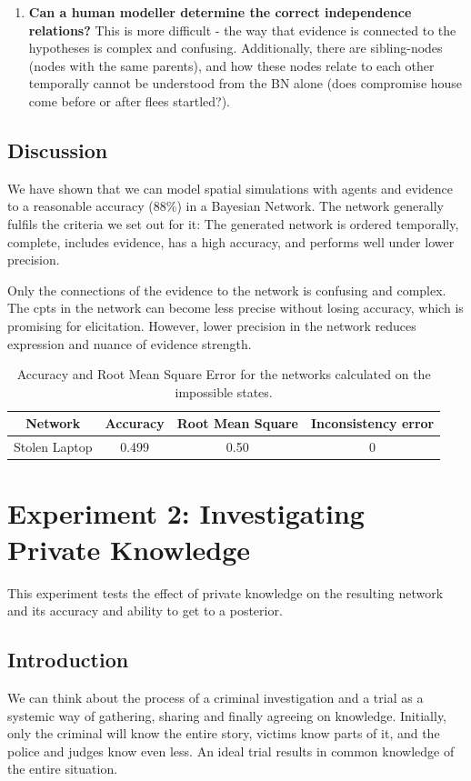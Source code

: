 \begin{enumerate}
	\item \textbf{ Can a human modeller determine the correct independence relations?}
	This is more difficult - the way that evidence is connected to the hypotheses is complex and confusing. Additionally, there are sibling-nodes (nodes with the same parents), and how these nodes relate to each other temporally cannot be understood from the BN alone (does compromise house come before or after flees startled?). 
\end{enumerate}

\subsection{Discussion}
We have shown that we can model spatial simulations with agents and evidence to a reasonable accuracy (88\%) in a Bayesian Network. The network generally fulfils the criteria we set out for it: The generated network is ordered temporally, complete, includes evidence, has a high accuracy, and performs well under lower precision.

 Only the connections of the evidence to the network is confusing and complex. The cpts in the network can become less precise without losing accuracy, which is promising for elicitation. However, lower precision in the network reduces expression and nuance of evidence strength.
 
  \begin{table}[htp]
\begin{center}
\begin{tabular}{|c|c|c|c|}
 \hline
 Network & Accuracy & Root Mean Square & Inconsistency error\\
 \hline
 Stolen Laptop   & 0.499 &  0.50 & 0   \\
\hline
\end{tabular}
\caption{Accuracy and Root Mean Square Error for the networks calculated on the impossible states.}
\end{center}
\label{tabB}
\end{table}


\section{Experiment 2: Investigating Private Knowledge}

This experiment tests the effect of private knowledge on the resulting network and its accuracy and ability to get to a posterior.

\subsection{Introduction}
We can think about the process of a criminal investigation and a trial as a systemic way of gathering, sharing and finally agreeing on knowledge. Initially, only the criminal will know the entire story, victims know parts of it, and the police and judges know even less. An ideal trial results in common knowledge of the entire situation.

